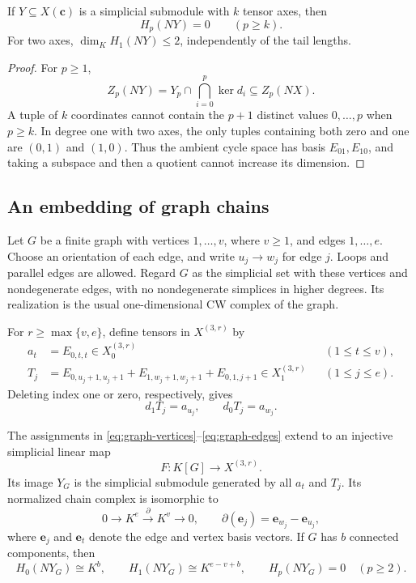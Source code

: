 \begin{corollary}
\label{cor:shifted-submodule-bound}
If $Y\subseteq X(\mathbf c)$ is a simplicial submodule with $k$ tensor
axes, then
\[
 H_p(NY)=0\qquad(p\geq k).
\]
For two axes, $\dim_K H_1(NY)\leq2$, independently of the tail lengths.
\end{corollary}

\begin{proof}
For $p\geq1$,
\[
 Z_p(NY)=Y_p\cap\bigcap_{i=0}^p\ker d_i
         \subseteq Z_p(NX).
\]
A tuple of $k$ coordinates cannot contain the $p+1$ distinct values
$0,\ldots,p$ when $p\geq k$. In degree one with two axes, the only
tuples containing both zero and one are $(0,1)$ and $(1,0)$.
Thus the ambient cycle space has basis $E_{01},E_{10}$, and taking a
subspace and then a quotient cannot increase its dimension.
\end{proof}

\subsection{An embedding of graph chains}

Let $G$ be a finite graph with vertices $1,\ldots,v$, where $v\geq1$,
and edges $1,\ldots,e$. Choose an orientation of each edge, and write
$u_j\to w_j$ for edge $j$. Loops and parallel edges are allowed. Regard
$G$ as the simplicial set with these vertices and nondegenerate edges,
with no nondegenerate simplices in higher degrees. Its realization is
the usual one-dimensional CW complex of the graph.

For $r\geq\max\{v,e\}$, define tensors in $X^{(3,r)}$ by
\begin{align}
 a_t&=E_{0,t,t}\in X^{(3,r)}_0
       &&(1\leq t\leq v),\label{eq:graph-vertices}\\
 T_j&=E_{0,u_j+1,u_j+1}+E_{1,w_j+1,w_j+1}
          +E_{0,1,j+1}\in X^{(3,r)}_1
       &&(1\leq j\leq e).\label{eq:graph-edges}
\end{align}
Deleting index one or zero, respectively, gives
\begin{equation}\label{eq:graph-endpoints}
 d_1T_j=a_{u_j},\qquad d_0T_j=a_{w_j}.
\end{equation}

\begin{theorem}
\label{thm:graph-representation}
The assignments in \eqref{eq:graph-vertices}--\eqref{eq:graph-edges}
extend to an injective simplicial linear map
\[
 F:K[G]\longrightarrow X^{(3,r)}.
\]
Its image $Y_G$ is the simplicial submodule generated by all $a_t$ and
$T_j$. Its normalized chain complex is isomorphic to
\begin{equation}\label{eq:graph-chain-complex}
 0\longrightarrow K^e
 \xrightarrow{\ \partial\ }K^v\longrightarrow0,
 \qquad \partial(\mathbf e_j)=\mathbf e_{w_j}-\mathbf e_{u_j},
\end{equation}
where $\mathbf e_j$ and $\mathbf e_t$ denote the edge and vertex basis vectors.
If $G$ has $b$ connected components, then
\[
 H_0(NY_G)\cong K^b,\qquad
 H_1(NY_G)\cong K^{e-v+b},\qquad
 H_p(NY_G)=0\quad(p\geq2).
\]
\end{theorem}

